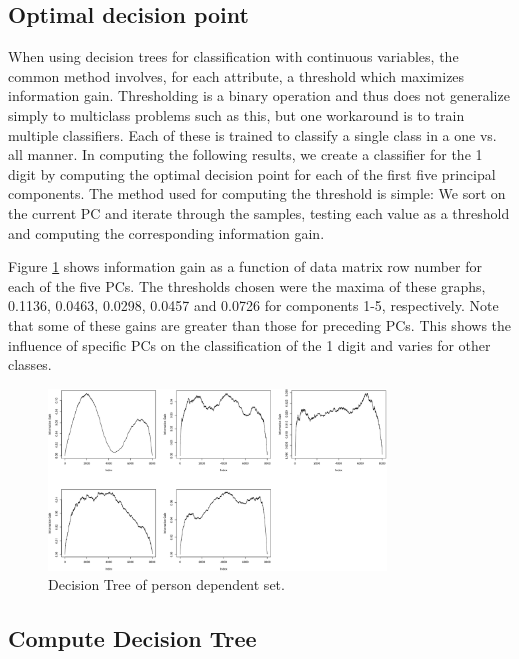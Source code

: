 \documentclass[paper=a4, fontsize=11pt]{scrartcl} %
\begin{document}
\subsection{Optimal decision point}
When using decision trees for classification with continuous variables, the common method involves, for each attribute, a threshold which maximizes information gain. Thresholding is a binary operation and thus does not generalize simply to multiclass problems such as this, but one workaround is to train multiple classifiers. Each of these is trained to classify a single class in a one vs. all manner. In computing the following results, we create a classifier for the 1 digit by computing the optimal decision point for each of the first five principal components. The method used for computing the threshold is simple: We sort on the current PC and iterate through the samples, testing each value as a threshold and computing the corresponding information gain.\par
 Figure \ref{fig:threshold} shows information gain as a function of data matrix row number for each of the five PCs. The thresholds chosen were the maxima of these graphs, 0.1136, 0.0463, 0.0298, 0.0457 and 0.0726 for components 1-5, respectively. Note that some of these gains are greater than those for preceding PCs. This shows the influence of specific PCs on the classification of the 1 digit and varies for other classes.
 \begin{figure}[h]
	\centering
	\includegraphics[width=0.8\textwidth]{figures/threshold.png}
	\caption{Decision Tree of person dependent set.}
	\label{fig:threshold}
\end{figure}

\subsection{Compute Decision Tree}
\end{document}
